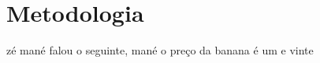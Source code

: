 \chapter{Metodologia}


zé mané falou o seguinte, mané o preço da banana é um e vinte \cite{gellner2008nations}